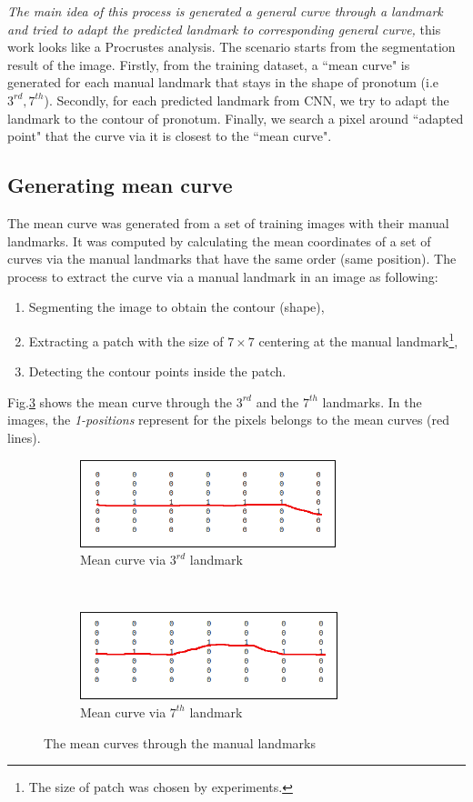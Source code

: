 \documentclass[10pt]{article}
\begin{document}
\textit{The main idea of this process is generated a general curve through a landmark and tried to adapt the predicted landmark to corresponding general curve,} this work looks like a Procrustes analysis. The scenario starts from the segmentation result of the image. Firstly, from the training dataset, a ``mean curve" is generated for each manual landmark that stays in the shape of pronotum (i.e $3^{rd}, 7^{th}$). Secondly, for each predicted landmark from CNN, we try to adapt the landmark to the contour of pronotum. Finally, we search a pixel around ``adapted point" that the curve via it is closest to the ``mean curve".

\subsection{Generating mean curve}
The mean curve was generated from a set of training images with their manual landmarks. It was computed by calculating the mean coordinates of a set of curves via the manual landmarks that have the same order (same position). The process to extract the curve via a manual landmark in an image as following:
\begin{enumerate}[nosep]
	\item Segmenting the image to obtain the contour (shape),
	\item Extracting a patch with the size of $7 \times 7$ centering at the manual landmark\footnote{The size of patch was chosen by experiments.},
	\item Detecting the contour points inside the patch.
\end{enumerate}
Fig.\ref{figshapect} shows the mean curve through the $3^{rd}$ and the $7^{th}$ landmarks. In the images, the \textit{1-positions} represent for the pixels belongs to the mean curves (red lines).

\begin{figure}[htbp]
    \centering
    \begin{subfigure}{0.5\textwidth}
        \centering
        \includegraphics[height=1in]{images/mean_cv_lm3}
        \caption{Mean curve via $3^{rd}$ landmark}
        \label{figsub111}
    \end{subfigure}~\\
    
    \begin{subfigure}[t]{0.5\textwidth}
        \centering
        \includegraphics[height=1in]{images/mean_cv_lm7}
        \caption{Mean curve via $7^{th}$ landmark}
        \label{figsub221}
    \end{subfigure}
    \caption{The mean curves through the manual landmarks } 
    \label{figshapect}
\end{figure}
\end{document}
